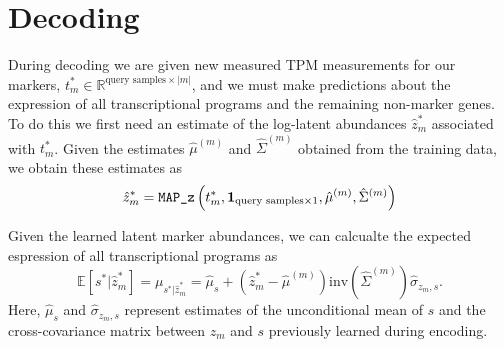 \documentclass[10pt]{article}
\begin{document}
\section{Decoding}

During decoding we are given new measured TPM measurements for our markers, $t^*_m \in \mathbb{R}^{\textrm{query samples} \times |m|} $, and we must make predictions about the expression of all transcriptional programs and the remaining non-marker genes. To do this we first need an estimate of the log-latent abundances $\hat{z}_m^*$ associated with $t^*_m $. Given the estimates $\hat{\mu}^{(m)}$ and $\hat{\Sigma}^{(m)} $ obtained from the training data, we obtain these estimates as 
\[
\hat{z}_m^* = \verb|MAP_z| \left(t_m^*, \textbf{1}_{\textrm{query samples} \times 1}, \hat{\mu}^{(m)}, \hat{\Sigma}^{(m)} \right)
\]



Given the learned latent marker abundances, we can calcualte the expected espression of all transcriptional programs as
\[
\mathbb{E}[s^* |\hat{z}_m^* ] = \mu_{s^* |\hat{z}_m^* } = \hat{\mu}_s + \left(\hat{z}_m^*  - \hat{\mu}^{(m)} \right)\textrm{inv}\left( \hat{\Sigma}^{(m)} \right)\hat{\sigma}_{z_{m},s}.
\]
Here, $\hat{\mu}_s $ and $\hat{\sigma}_{z_{m},s}$ represent estimates of the unconditional mean of $s$ and the cross-covariance matrix between $z_m$ and $s$ previously learned during encoding.
\end{document}
